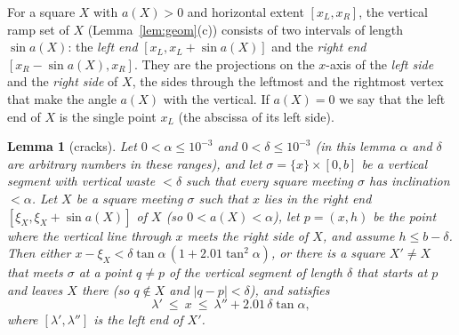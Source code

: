 \documentclass[11pt]{amsart}
\newtheorem{lemma}[theorem]{Lemma}
\theoremstyle{definition}
\theoremstyle{remark}
\begin{document}
For a square $X$ with $a(X)>0$ and horizontal extent $[x_L,x_R]$, the vertical ramp set of $X$ (Lemma~\ref{lem:geom}(c))
consists of two intervals of length $\sin a(X)$: the \emph{left end} $[x_L,x_L+\sin a(X)]$ and the \emph{right end}
$[x_R-\sin a(X),x_R]$. They are the projections on the $x$-axis of the \emph{left side} and the \emph{right side} of $X$, the sides
through the leftmost and the rightmost vertex that make the angle $a(X)$ with the vertical. If $a(X)=0$ we say that the left
end of $X$ is the single point $x_L$ (the abscissa of its left side).

\begin{lemma}[cracks]\label{lem:crack}
Let $0<\alpha\le10^{-3}$ and $0<\delta\le10^{-3}$ \textup{(}in this lemma $\alpha$ and $\delta$ are arbitrary numbers in these ranges\textup{)}, and let $\sigma=\{x\}\times[0,b]$ be a vertical segment with vertical waste
$<\delta$ such that every square meeting $\sigma$ has inclination $<\alpha$. Let $X$ be a square meeting $\sigma$ such that $x$ lies in
the right end $[\xi_X,\xi_X+\sin a(X)]$ of $X$ \textup{(}so $0<a(X)<\alpha$\textup{)}, let $p=(x,h)$ be the point where the vertical
line through $x$ meets the right side of $X$, and assume $h\le b-\delta$. Then either
$x-\xi_X<\delta\tan\alpha\,(1+2.01\tan^2\alpha)$, or there is a square $X'\ne X$ that meets $\sigma$ at a point $q\ne p$ of the
vertical segment of length $\delta$ that starts at $p$ and leaves $X$ there \textup{(}so $q\notin X$ and $|q-p|<\delta$\textup{)}, and satisfies
\[
\lambda'\ \le\ x\ \le\ \lambda''+2.01\,\delta\tan\alpha ,
\]
where $[\lambda',\lambda'']$ is the left end of $X'$.
\end{lemma}
\end{document}
